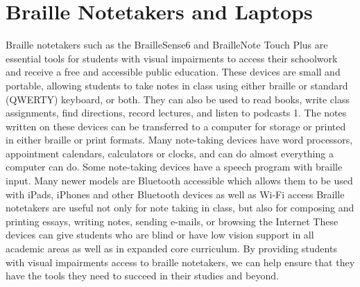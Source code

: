 \documentclass[14pt,letterpaper,twoside]{extreport}
\begin{document}
\pagebreak 
	\hypertarget{braille-notetakers-and-braille-laptop-computers}{}\section{Braille Notetakers and Laptops}\label{braille-notetakers-and-braille-laptop-computers}

Braille notetakers such as the BrailleSense6 and BrailleNote Touch Plus are essential tools for students with visual impairments to access their schoolwork and receive a free and accessible public education. These devices are small and portable, allowing students to take notes in class using either braille or standard (QWERTY) keyboard, or both. They can also be used to read books, write class assignments, find directions, record lectures, and listen to podcasts 1. The notes written on these devices can be transferred to a computer for storage or printed in either braille or print formats. Many note-taking devices have word processors, appointment calendars, calculators or clocks, and can do almost everything a computer can do. Some note-taking devices have a speech program with braille input. Many newer models are Bluetooth accessible which allows them to be used with iPads, iPhones and other Bluetooth devices as well as Wi-Fi access Braille notetakers are useful not only for note taking in class, but also for composing and printing essays, writing notes, sending e-mails, or browsing the Internet These devices can give students who are blind or have low vision support in all academic areas as well as in expanded core curriculum. By providing students with visual impairments access to braille notetakers, we can help ensure that they have the tools they need to succeed in their studies and beyond.
\end{document}
